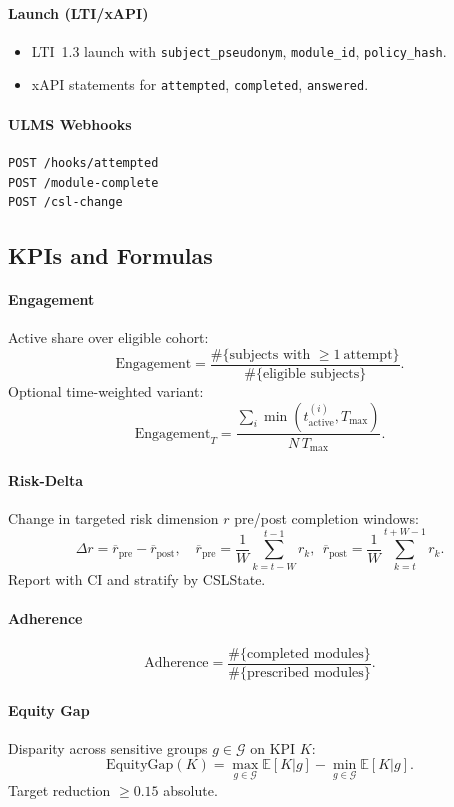 \documentclass[11pt]{article}
\theoremstyle{plain}
\begin{document}
\paragraph{Launch (LTI/xAPI)}
\begin{itemize}
  \item LTI~1.3 launch with \texttt{subject\_pseudonym}, \texttt{module\_id}, \texttt{policy\_hash}.
  \item xAPI statements for \texttt{attempted}, \texttt{completed}, \texttt{answered}.
\end{itemize}

\paragraph{ULMS Webhooks}
\begin{verbatim}
POST /hooks/attempted
POST /module-complete
POST /csl-change
\end{verbatim}

\subsection{KPIs and Formulas}
\paragraph{Engagement}
Active share over eligible cohort:
\[
\mathrm{Engagement} = \frac{\#\{\text{subjects with }\ge 1\ \text{attempt}\}}{\#\{\text{eligible subjects}\}}.
\]
Optional time-weighted variant:
\[
\mathrm{Engagement}_T = \frac{\sum_i \min(t^{(i)}_{\mathrm{active}},T_{\max})}{N\,T_{\max}}.
\]

\paragraph{Risk-Delta}
Change in targeted risk dimension $r$ pre/post completion windows:
\[
\Delta r = \overline{r}_{\mathrm{pre}} - \overline{r}_{\mathrm{post}},\quad
\overline{r}_{\mathrm{pre}}=\frac{1}{W}\sum_{k=t-W}^{t-1} r_k,\ \
\overline{r}_{\mathrm{post}}=\frac{1}{W}\sum_{k=t}^{t+W-1} r_k.
\]
Report with CI and stratify by CSLState.

\paragraph{Adherence}
\[
\mathrm{Adherence} = \frac{\#\{\text{completed modules}\}}{\#\{\text{prescribed modules}\}}.
\]

\paragraph{Equity Gap}
Disparity across sensitive groups $g\in\mathcal{G}$ on KPI $K$:
\[
\mathrm{EquityGap}(K)=\max_{g\in\mathcal{G}} \mathbb{E}[K|g]-\min_{g\in\mathcal{G}} \mathbb{E}[K|g].
\]
Target reduction $\ge 0.15$ absolute.
\end{document}
